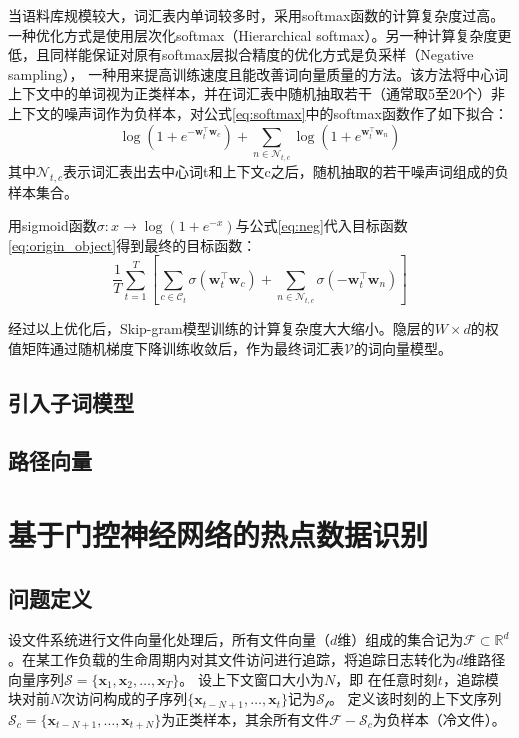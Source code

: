 当语料库规模较大，词汇表内单词较多时，采用softmax函数的计算复杂度过高。一种优化方式是使用层次化softmax（Hierarchical softmax）\cite{Hierarchical_softmax}。另一种计算复杂度更低，且同样能保证对原有softmax层拟合精度的优化方式是负采样（Negative sampling），
一种用来提高训练速度且能改善词向量质量的方法。该方法将中心词上下文中的单词视为正类样本，并在词汇表中随机抽取若干（通常取5至20个）非上下文的噪声词作为负样本，对公式\ref{eq:softmax}中的softmax函数作了如下拟合：
\begin{equation}
    \label{eq:neg}
    \log(1+e^{-\mathbf{w}_t^{\top} \mathbf{w}_c})+ \sum_{n \in \mathcal{N}_{t,c} }\log(1+ e^{\mathbf{w}_t^{\top} \mathbf{w}_n})
\end{equation}
其中$\mathcal{N}_{t,c}$表示词汇表出去中心词t和上下文c之后，随机抽取的若干噪声词组成的负样本集合。

用sigmoid函数$\sigma:x \rightarrow \log(1+e^{-x})$与公式\ref{eq:neg}代入目标函数\ref{eq:origin_object}得到最终的目标函数：
\begin{equation}
    \frac{1}{T} \sum_{t=1}^{T} \left[ \sum_{c \in \mathcal{C}_t} \sigma(\mathbf{w}_t^{\top} \mathbf{w}_c) + \sum_{n \in \mathcal{N}_{t,c}} \sigma(-\mathbf{w}_t^{\top} \mathbf{w}_n) \right]
\end{equation}

经过以上优化后，Skip-gram模型训练的计算复杂度大大缩小。隐层的$W\times d$的权值矩阵通过随机梯度下降训练收敛后，作为最终词汇表$\mathcal{V}$的词向量模型。

\subsection{引入子词模型}
\subsection{路径向量}
\section{基于门控神经网络的热点数据识别}
\subsection{问题定义}
设文件系统进行文件向量化处理后，所有文件向量（$d$维）组成的集合记为$\mathcal{F} \subset \mathbb{R}^d$。在某工作负载的生命周期内对其文件访问进行追踪，将追踪日志转化为$d$维路径向量序列$\mathcal{S}=\{\mathbf{x}_1, \mathbf{x}_2,\dots, \mathbf{x}_T\}$。
设上下文窗口大小为$N$，即
在任意时刻$t$，追踪模块对前$N$次访问构成的子序列$\{\mathbf{x}_{t-N+1}, \dots, \mathbf{x}_t\}$记为$\mathcal{S_t}$。
定义该时刻的上下文序列$\mathcal{S}_c = \{ \mathbf{x}_{t-N+1}, \dots, \mathbf{x}_{t+N} \}$为正类样本，其余所有文件$\mathcal{F} - \mathcal{S}_c$为负样本（冷文件）。

